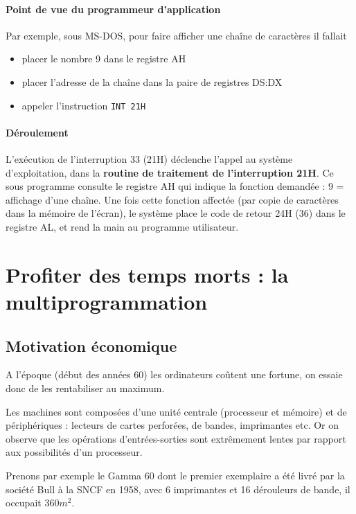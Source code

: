 \begin{multicols}{2}
\paragraph{Point de vue du programmeur d'application}

Par exemple, sous MS-DOS, pour faire afficher une chaîne de caractères il
fallait
\begin{itemize}
\item placer le nombre 9 dans le registre AH
\item placer l'adresse de la chaîne dans la paire de registres DS:DX
\item appeler l'instruction  \texttt{INT 21H}
\end{itemize}


\paragraph{Déroulement} L'exécution de l'interruption 33 (21H)
déclenche l'appel au système d'exploitation, dans la \textbf{ routine
  de traitement de l'interruption 21H}. Ce sous programme consulte le
registre AH qui indique la fonction demandée : 9 = affichage d'une
chaîne. Une fois cette fonction affectée (par copie de caractères
dans la mémoire de l'écran), le système place le code de retour 24H
(36) dans le registre AL, et rend la main au programme utilisateur.


\section{Profiter des temps morts : la multiprogrammation}

\subsection{Motivation économique}

A l'époque (début des années 60) les ordinateurs coûtent une fortune,
 on essaie donc de les rentabiliser au maximum.

Les machines sont composées d'une unité centrale (processeur et
mémoire) et de périphériques : lecteurs de cartes perforées, de
bandes, imprimantes etc.
Or on observe que les opérations d'entrées-sorties sont extrêmement
lentes par rapport aux possibilités d'un processeur.

Prenons par exemple le Gamma 60 dont le premier exemplaire a été livré
par la société Bull à la SNCF en 1958, avec 6 imprimantes et 16 dérouleurs
de bande, il occupait $360 m^2$.


\end{multicols}
